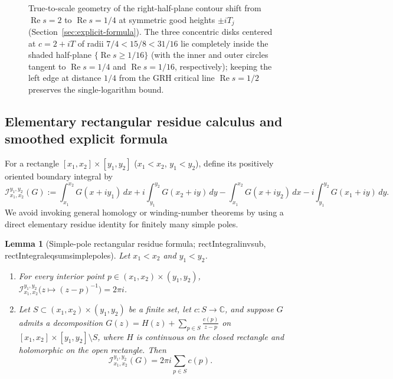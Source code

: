 \documentclass[11pt,reqno]{amsart}
\numberwithin{equation}{section}
\newtheorem{lemma}[theorem]{Lemma}
\theoremstyle{definition}
\newcommand{\C}{\mathbb{C}}
\newcommand{\1}{\mathbf{1}}
\renewcommand{\Re}{\operatorname{Re}}
\newcommand{\lean}[1]{{\footnotesize\ttfamily\renewcommand{\_}{\textunderscore\allowbreak}#1}}
\newcommand{\GRH}{\textup{GRH}}
\begin{document}
\begin{figure}[htbp]
\caption{True-to-scale geometry of the right-half-plane contour shift from $\Re s = 2$ to $\Re s = 1/4$ at symmetric good heights $\pm i T_j$ (Section~\ref{sec:explicit-formula}). The three concentric disks centered at $c = 2+iT$ of radii $7/4 < 15/8 < 31/16$ lie completely inside the shaded half-plane $\{\Re s \ge 1/16\}$ (with the inner and outer circles tangent to $\Re s = 1/4$ and $\Re s = 1/16$, respectively); keeping the left edge at distance $1/4$ from the \GRH{} critical line $\Re s = 1/2$ preserves the single-logarithm bound.}
\label{fig:contour}
\end{figure}

\subsection{Elementary rectangular residue calculus and smoothed explicit formula}

For a rectangle $[x_1, x_2] \times [y_1, y_2]$ ($x_1 < x_2$, $y_1 < y_2$), define its positively oriented boundary integral by
\[
  \mathcal{I}_{x_1, x_2}^{y_1, y_2}(G)
  := \int_{x_1}^{x_2} G(x + i y_1)\,dx + i\int_{y_1}^{y_2} G(x_2 + i y)\,dy
     - \int_{x_1}^{x_2} G(x + i y_2)\,dx - i\int_{y_1}^{y_2} G(x_1 + i y)\,dy.
\]
We avoid invoking general homology or winding-number theorems by using a direct elementary residue identity for finitely many simple poles.

\begin{lemma}[Simple-pole rectangular residue formula; \lean{rectIntegral\_inv\_sub}, \lean{rectIntegral\_eq\_sum\_simple\_poles}]
\label{lem:rect-residue}
Let $x_1 < x_2$ and $y_1 < y_2$.
\begin{enumerate}[label=(\alph*)]
  \item For every interior point $p \in (x_1, x_2) \times (y_1, y_2)$, $\mathcal{I}_{x_1, x_2}^{y_1, y_2}\!\bigl(z \mapsto (z - p)^{-1}\bigr) = 2\pi i$.
  \item Let $S \subset (x_1, x_2) \times (y_1, y_2)$ be a finite set, let $c : S \to \C$, and suppose $G$ admits a decomposition $G(z) = H(z) + \sum_{p \in S} \frac{c(p)}{z - p}$ on $[x_1, x_2] \times [y_1, y_2] \setminus S$, where $H$ is continuous on the closed rectangle and holomorphic on the open rectangle. Then
  \[
    \mathcal{I}_{x_1, x_2}^{y_1, y_2}(G) = 2\pi i \sum_{p \in S} c(p).
  \]
\end{enumerate}
\end{lemma}
\end{document}
